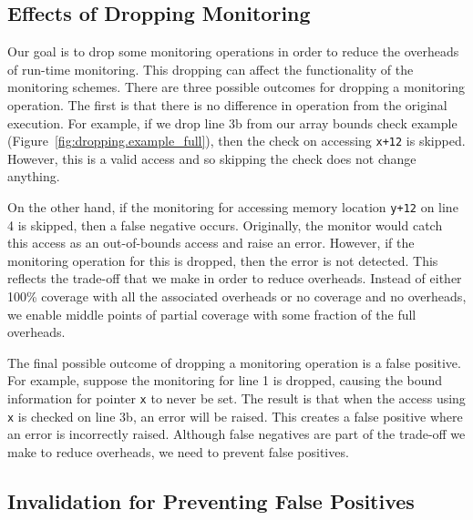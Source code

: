 \subsection{Effects of Dropping Monitoring}
\label{sec:dropping.false_neg_pos}

Our goal is to drop some monitoring operations in order to reduce the overheads
of run-time monitoring. This dropping can affect the functionality of the
monitoring schemes. There are three possible outcomes for dropping a
monitoring operation. The first is that there is no difference in operation
from the original execution. For example, if we drop line 3b from our array
bounds check example (Figure~\ref{fig:dropping.example_full}), then the
check on accessing {\tt x+12} is skipped. However, this is a valid access and so
skipping the check does not change anything.

On the other hand, if the monitoring for accessing memory location {\tt y+12} on
line 4 is skipped, then
a false negative occurs. Originally, the monitor would catch this access as an
out-of-bounds access and raise an error. However, if the monitoring operation
for this is dropped, then the error is not detected. This reflects the trade-off that
we make in order to reduce overheads. Instead of either 100\% coverage
with all the associated overheads or no coverage and no overheads, we 
enable middle points of partial coverage with some fraction of the full
overheads.

The final possible outcome of dropping a monitoring operation is a false positive. 
For example, suppose the monitoring for
line 1 is dropped, causing the bound information for pointer {\tt x} to never
be set. The result is that when the access using {\tt x} is checked on line 3b,
an error will be raised. This creates a false positive where an error is
incorrectly raised. Although false negatives are part of the trade-off we make
to reduce overheads, we need to prevent false positives.

\subsection{Invalidation for Preventing False Positives}
\label{sec:dropping.prevent_false_pos}


